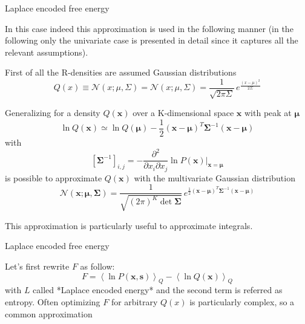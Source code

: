 \documentclass[a4paper, 10pt]{article}
\begin{document}
\newpage
Laplace encoded free energy

In this case indeed this approximation is used in the following manner (in the following only the univariate case is presented in detail since it captures all the relevant assumptions).

First of all the R-densities are assumed Gaussian distributions
$$
Q(x) \equiv \mathcal{N}(x;\mu,\Sigma)= \mathcal{N}(x;\mu, \Sigma) = \frac{1}{\sqrt{ 2 \pi \Sigma}} \, e^{\frac{(x-\mu)^2}{2 \Sigma}}
$$





Generalizing for a density $Q(\mathbf x)$ over a K-dimensional space $\mathbf x$ with peak at $\boldsymbol \mu$
\begin{equation}
\ln Q(\mathbf x) \simeq \ln Q(\boldsymbol{\mu}) - \frac{1}{2} (\boldsymbol x-\boldsymbol \mu)^T \boldsymbol \Sigma^{-1} (\boldsymbol x-\boldsymbol \mu)
\end{equation}
with
\begin{equation}
\left[ \boldsymbol \Sigma^{-1}\right]_{i,j} = - \frac{\partial^{2} }{\partial x_i \partial x_j} \ln P(\boldsymbol x) \bigg\rvert_{\mathbf x=\boldsymbol \mu} 
\end{equation}
is possible to approximate $Q(\mathbf x)$ with the multivariate Gaussian distribution
\begin{equation}
\mathcal{N}(\mathbf x;\boldsymbol \mu, \boldsymbol \Sigma) = \frac{1}{\sqrt{( 2 \pi)^{K} \det \boldsymbol \Sigma}} \, e^{\frac{1}{2} (\boldsymbol x-\boldsymbol \mu)^T \boldsymbol \Sigma^{-1} (\boldsymbol x-\boldsymbol \mu)}
\end{equation}

This approximation is particularly useful to approximate integrals. 




Laplace encoded free energy

Let's first rewrite $F$ as follow:
$$
F= \left< \ln P(\mathbf x,\mathbf s) \right>_{Q} - \left< \ln Q(\mathbf x) \right>_{Q}
$$
with $L$ called *Laplace encoded energy* and the second term is referred as entropy.
Often optimizing $F$ for arbitrary $Q(x)$ is particularly complex, so a common approximation 


\newpage

\printbibliography
\end{document}
